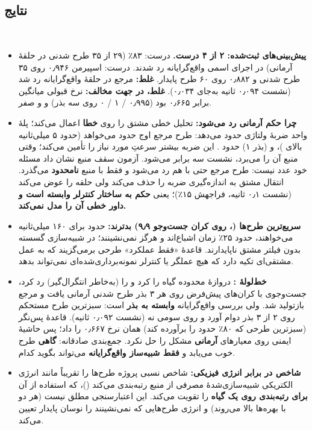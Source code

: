 ‫\documentclass[a4paper,12pt]{article}
\begin{document}
‫
‫\subsection{نتایج}
‫\begin{itemize}
‫\item \textbf{پیش‌بینی‌های ثبت‌شده: ۲ از ۴ درست.}  درست: ۸۳٪ (۲۹ از ۳۵ طرح شدنی در حلقهٔ آرمانی) در اجرای اسمی واقع‌گرایانه رد شدند.  درست: اسپیرمن ۰٫۹۴۶ روی ۳۵ طرح شدنی و ۰٫۸۸۲ روی ۶۰ طرح پایدار. \textbf{ غلط:}  مرجع  در حلقهٔ واقع‌گرایانه رد شد (نشست ۰٫۰۹۴ ثانیه به‌جای ۰٫۰۳۴). \textbf{ غلط، در جهت مخالف:} نرخ قبولی میانگین  برابر ۰٫۶۶۵ بود (۰٫۹۹۵ / ۱ / ۰ روی سه بذر) و  و  صفر.
‫\item \textbf{چرا حکم آرمانی رد می‌شود:} تحلیل خطی مشتق را روی \textbf{خطا} اعمال می‌کند؛ پلهٔ واحد ضربهٔ ولتاژی حدود  می‌دهد: طرح مرجع  اوج حدود  می‌خواهد (حدود ۵ میلی‌ثانیه بالای )، و  (بذر ۱) حدود . این ضربه بیشتر سرعتِ مورد نیاز را تأمین می‌کند؛ وقتی منبع آن را می‌برد، نشست سه برابر می‌شود. آزمون سقف منبع نشان داد مسئله خود عدد  نیست: طرح مرجع حتی با  هم رد می‌شود و فقط با منبع \textbf{نامحدود} می‌گذرد. انتقال مشتق به اندازه‌گیری ضربه را حذف می‌کند ولی حلقه را عوض می‌کند (نشست ۰٫۱ ثانیه، فراجهش ۱۵٪)؛ یعنی \textbf{حکم به ساختار کنترلر وابسته است و داور خطی آن را مدل نمی‌کند.}
‫\item \textbf{سریع‌ترین طرح‌ها (،  روی کران جست‌وجو ۹٫۹) بدترند:} حدود  برای ۱۶۰ میلی‌ثانیه می‌خواهند، حدود ۲۵٪ زمان اشباع‌اند و هرگز نمی‌نشینند؛ در شبیه‌سازی گسسته بدون فیلتر مشتق ناپایدارند. قاعدهٔ «فقط عملکرد» طرحی برمی‌گزیند که به عمل مشتقی‌ای تکیه دارد که هیچ عملگر یا کنترلر نمونه‌برداری‌شده‌ای نمی‌تواند بدهد.
‫\item \textbf{خط‌لولهٔ :} دروازهٔ محدوده گیاه را  کرد و  را (به‌خاطر انتگرال‌گیر) رد کرد، جست‌وجوی  با کران‌های پیش‌فرض روی هر ۳ بذر طرح شدنی آرمانی یافت و مرجع  بازتولید شد. ولی بررسی واقع‌گرایانه \textbf{وابسته به بذر} است: سبزترین طرح مستحکم روی ۲ از ۳ بذر دوام آورد و روی سومی نه (نشست ۰٫۰۹۲ ثانیه). قاعدهٔ پس‌نگر  (سبزترین طرحی که ۸۰٪ حدود را برآورده کند) همان نرخ ۰٫۶۶۷ را داد؛ پس حاشیهٔ ایمنی روی معیارهای \textbf{آرمانی} مشکل را حل نکرد. جمع‌بندی صادقانه:  \textbf{گاهی} طرح خوب می‌یابد و \textbf{فقط شبیه‌ساز واقع‌گرایانه} می‌تواند بگوید کدام.
‫\item \textbf{شاخص  در برابر انرژی فیزیکی:} شاخص نسبی پروژه طرح‌ها را تقریباً مانند انرژی الکتریکی شبیه‌سازی‌شدهٔ مصرفی از منبع رتبه‌بندی می‌کند ()، که استفاده از آن \textbf{برای رتبه‌بندی روی یک گیاه} را تقویت می‌کند. این اعتبارسنجی مطلق نیست (هر دو با بهره‌ها بالا می‌روند) و انرژی طرح‌هایی که نمی‌نشینند را نوسان پایدار تعیین می‌کند.
‫\end{itemize}
\end{document}
